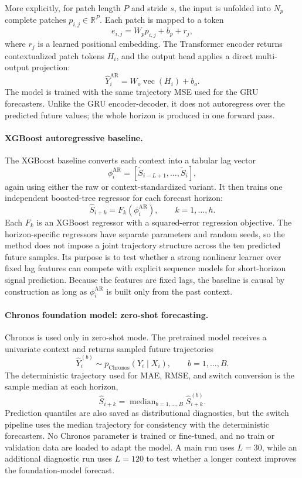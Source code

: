 More explicitly, for patch length \(P\) and stride \(s\), the input is unfolded
into \(N_p\) complete patches \(p_{i,j}\in\mathbb{R}^{P}\). Each patch is mapped
to a token
\[
  e_{i,j}=W_p p_{i,j}+b_p+r_j ,
\]
where \(r_j\) is a learned positional embedding. The Transformer encoder returns
contextualized patch tokens \(H_i\), and the output head applies a direct
multi-output projection:
\[
  \widehat{Y}_i^{\text{AR}}
  =
  W_o\operatorname{vec}(H_i)+b_o .
\]
The model is trained with the same trajectory MSE used for the GRU forecasters.
Unlike the GRU encoder-decoder, it does not autoregress over the predicted
future values; the whole horizon is produced in one forward pass.

\paragraph{XGBoost autoregressive baseline.}
The XGBoost baseline converts each context into a tabular lag vector
\[
  \phi_i^{\text{AR}}
  =
  [\widetilde{S}_{i-L+1},\ldots,\widetilde{S}_i],
\]
again using either the raw or context-standardized variant. It then trains one
independent boosted-tree regressor for each forecast horizon:
\[
  \widehat{S}_{i+k}=F_k(\phi_i^{\text{AR}}),
  \qquad k=1,\ldots,h .
\]
Each \(F_k\) is an XGBoost regressor with a squared-error regression objective.
The horizon-specific regressors have separate parameters and random seeds, so
the method does not impose a joint trajectory structure across the ten predicted
future samples. Its purpose is to test whether a strong nonlinear learner over
fixed lag features can compete with explicit sequence models for short-horizon
signal prediction. Because the features are fixed lags, the baseline is causal
by construction as long as \(\phi_i^{\text{AR}}\) is built only from the past
context.

\paragraph{Chronos foundation model: zero-shot forecasting.}
Chronos is used only in zero-shot mode. The pretrained model receives a
univariate context and returns sampled future trajectories
\[
  \widehat{Y}_{i}^{(b)}
  \sim
  p_{\mathrm{Chronos}}(Y_i\mid X_i),
  \qquad b=1,\ldots,B .
\]
The deterministic trajectory used for MAE, RMSE, and switch conversion is the
sample median at each horizon,
\[
  \widehat{S}_{i+k}
  =
  \operatorname{median}_{b=1,\ldots,B}
  \widehat{S}_{i+k}^{(b)} .
\]
Prediction quantiles are also saved as distributional diagnostics, but the
switch pipeline uses the median trajectory for consistency with the
deterministic forecasters. No Chronos parameter is trained or fine-tuned, and no
train or validation data are loaded to adapt the model. A main run uses
\(L=30\), while an additional diagnostic run uses \(L=120\) to test whether a
longer context improves the foundation-model forecast.

